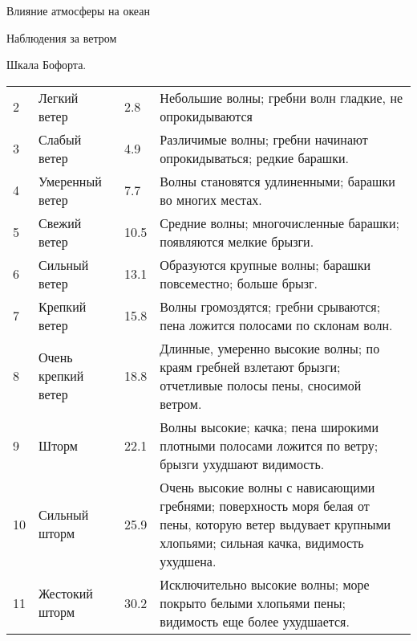 \begin{chapter}{Влияние атмосферы на океан}
\begin{section}{Наблюдения за ветром}
\begin{paragraph}{Шкала Бофорта.}
\begin{table}
\begin{footnotesize}
\begin{tabular}{|p{}|p{}|p{}|p{}|}
2 & Легкий ветер & 2.8 &
Небольшие волны; гребни волн гладкие, не опрокидываются \\

3 & Слабый ветер & 4.9 & 
Различимые волны; гребни начинают опрокидываться; редкие барашки. \\

4 & Умеренный ветер & 7.7 &
Волны становятся удлиненными; барашки во многих местах. \\

5 & Свежий ветер & 10.5 &
Средние волны; многочисленные барашки; появляются мелкие брызги. \\

6 & Сильный ветер & 13.1 & 
Образуются крупные волны; барашки повсеместно; больше брызг. \\

7 & Крепкий ветер & 15.8 & 
Волны громоздятся; гребни срываются; пена ложится полосами по склонам
волн. \\

8 & Очень крепкий ветер & 18.8 &
Длинные, умеренно высокие волны; по краям гребней взлетают брызги;
отчетливые полосы пены, сносимой ветром. \\

9 & Шторм & 22.1 & 
Волны высокие; качка; пена широкими плотными полосами ложится по
ветру; брызги ухудшают видимость. \\

10 & Сильный шторм & 25.9 & 
Очень высокие волны с нависающими гребнями; поверхность моря белая от
пены, которую ветер выдувает крупными хлопьями; сильная качка,
видимость ухудшена. \\

11 & Жестокий шторм & 30.2 & 
Исключительно высокие волны; море покрыто белыми хлопьями пены;
видимость еще более ухудшается. \\


\end{tabular}
\end{footnotesize}
\end{table}
\end{paragraph}
\end{section}
\end{chapter}
